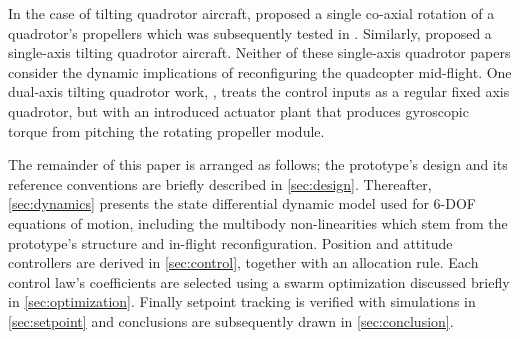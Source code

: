 \documentclass[a4paper, 10pt, conference]{ieeeconf}
\begin{document}
\par
In the case of tilting quadrotor aircraft, \cite{tiltingmodelling} proposed a single co-axial rotation of a quadrotor's propellers which was subsequently tested in \cite{tiltingtest}. Similarly, \cite{nemati} proposed a single-axis tilting quadrotor aircraft. Neither of these single-axis quadrotor papers consider the dynamic implications of reconfiguring the quadcopter mid-flight. One dual-axis tilting quadrotor work, \cite{tiltgasco}, treats the control inputs as a regular fixed axis quadrotor, but with an introduced actuator plant that produces gyroscopic torque from pitching the rotating propeller module.
\par
The remainder of this paper is arranged as follows; the prototype's design and its reference conventions are briefly described in \ref{sec:design}. Thereafter, \ref{sec:dynamics} presents the state differential dynamic model used for 6-DOF equations of motion, including the multibody non-linearities which stem from the prototype's structure and in-flight reconfiguration. Position and attitude controllers are derived in \ref{sec:control}, together with an allocation rule. Each control law's coefficients are selected using a swarm optimization discussed briefly in \ref{sec:optimization}. Finally setpoint tracking is verified with simulations in \ref{sec:setpoint} and conclusions are subsequently drawn in \ref{sec:conclusion}.
\end{document}
